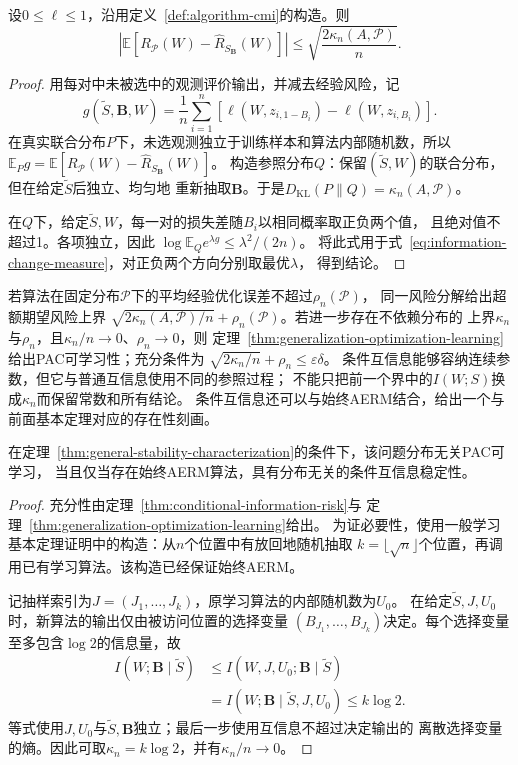 \begin{theorem}[条件互信息与期望风险]
\label{thm:conditional-information-risk}
设$0\leq\ell\leq1$，沿用定义~\ref{def:algorithm-cmi}的构造。则
\[
 \left|\mathbb E[R_{\mathcal P}(W)-\hat R_{S_{\bm B}}(W)]\right|
 \leq\sqrt{\frac{2\kappa_n(A,\mathcal P)}n}.
\]
\end{theorem}
\begin{proof}
用每对中未被选中的观测评价输出，并减去经验风险，记
\[
 g(\tilde S,\bm B,W)=\frac1n\sum_{i=1}^n
 [\ell(W,z_{i,1-B_i})-\ell(W,z_{i,B_i})].
\]
在真实联合分布$P$下，未选观测独立于训练样本和算法内部随机数，所以
$\mathbb E_Pg=\mathbb E[R_{\mathcal P}(W)-\hat R_{S_{\bm B}}(W)]$。
构造参照分布$Q$：保留$(\tilde S,W)$的联合分布，但在给定$\tilde S$后独立、均匀地
重新抽取$\bm B$。于是$D_{\mathrm{KL}}(P\|Q)=\kappa_n(A,\mathcal P)$。

在$Q$下，给定$\tilde S,W$，每一对的损失差随$B_i$以相同概率取正负两个值，
且绝对值不超过1。各项独立，因此
$\log\mathbb E_Q e^{\lambda g}\leq\lambda^2/(2n)$。
将此式用于式~\eqref{eq:information-change-measure}，对正负两个方向分别取最优$\lambda$，
得到结论。
\end{proof}

若算法在固定分布$\mathcal P$下的平均经验优化误差不超过$\rho_n(\mathcal P)$，
同一风险分解给出超额期望风险上界
$\sqrt{2\kappa_n(A,\mathcal P)/n}+\rho_n(\mathcal P)$。若进一步存在不依赖分布的
上界$\kappa_n$与$\rho_n$，且$\kappa_n/n\to0$、$\rho_n\to0$，则
定理~\ref{thm:generalization-optimization-learning}给出PAC可学习性；充分条件为
$\sqrt{2\kappa_n/n}+\rho_n\leq\varepsilon\delta$。
条件互信息能够容纳连续参数，但它与普通互信息使用不同的参照过程；
不能只把前一个界中的$I(W;S)$换成$\kappa_n$而保留常数和所有结论。
条件互信息还可以与始终AERM结合，给出一个与前面基本定理对应的存在性刻画。

\begin{theorem}[条件互信息稳定性与可学习性]
\label{thm:conditional-information-learning}
在定理~\ref{thm:general-stability-characterization}的条件下，该问题分布无关PAC可学习，
当且仅当存在始终AERM算法，具有分布无关的条件互信息稳定性。
\end{theorem}
\begin{proof}
充分性由定理~\ref{thm:conditional-information-risk}与
定理~\ref{thm:generalization-optimization-learning}给出。
为证必要性，使用一般学习基本定理证明中的构造：从$n$个位置中有放回地随机抽取
$k=\lfloor\sqrt n\rfloor$个位置，再调用已有学习算法。该构造已经保证始终AERM。

记抽样索引为$J=(J_1,\ldots,J_k)$，原学习算法的内部随机数为$U_0$。
在给定$\tilde S,J,U_0$时，新算法的输出仅由被访问位置的选择变量
$(B_{J_1},\ldots,B_{J_k})$决定。每个选择变量至多包含$\log2$的信息量，故
\begin{align*}
 I(W;\bm B\mid\tilde S)
 &\leq I(W,J,U_0;\bm B\mid\tilde S)\\
 &=I(W;\bm B\mid\tilde S,J,U_0)
 \leq k\log2.
\end{align*}
等式使用$J,U_0$与$\tilde S,\bm B$独立；最后一步使用互信息不超过决定输出的
离散选择变量的熵。因此可取$\kappa_n=k\log2$，并有$\kappa_n/n\to0$。
\end{proof}

